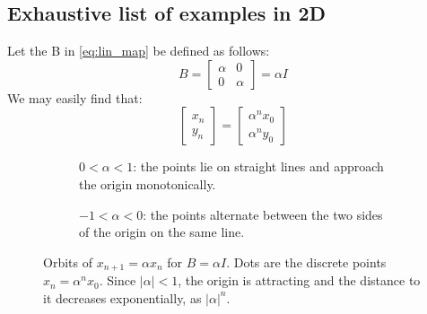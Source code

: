 \subsection{Exhaustive list of examples in 2D}
\begin{example}
    Let the B in \autoref{eq:lin_map} be defined as follows:
    \begin{equation*}
        B=\begin{bmatrix}
            \alpha & 0 \\  0 & \alpha
        \end{bmatrix}=\alpha I
    \end{equation*}
    We may easily find that:
    \begin{equation*}
        \begin{bmatrix}
            x_n \\ y_n
        \end{bmatrix}=\begin{bmatrix}
            \alpha^n x_0 \\ \alpha^n y_0
        \end{bmatrix}
    \end{equation*}

    \begin{figure}[ht]
        \centering
        \begin{subfigure}[t]{0.48\textwidth}
            \centering
            \caption{$0<\alpha<1$: the points lie on straight lines and approach the origin monotonically.}
        \end{subfigure}\hfill
        \begin{subfigure}[t]{0.48\textwidth}
            \centering
            \caption{$-1<\alpha<0$: the points alternate between the two sides of the origin on the same line.}
        \end{subfigure}

        \caption{Orbits of $x_{n+1}=\alpha x_n$ for $B=\alpha I$. Dots are the discrete points $x_n=\alpha^n x_0$. Since $|\alpha|<1$, the origin is attracting and the distance to it decreases exponentially, as $|\alpha|^n$.}
        \label{fig:discrete_star}
    \end{figure}
\end{example}

